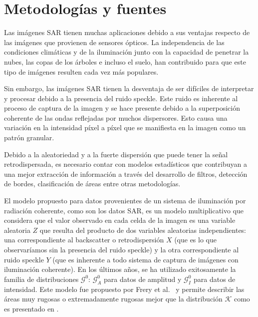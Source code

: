 \documentclass[12pt]{article}
\begin{document}
\section{Metodologías y fuentes}


Las imágenes SAR tienen muchas aplicaciones debido a sus ventajas respecto de las imágenes que provienen de sensores ópticos. La independencia de las condiciones climáticas y de la iluminación junto con la capacidad de penetrar la nubes, las copas de los árboles e incluso el suelo, han contribuido para que este tipo de imágenes resulten cada vez más populares.

Sin embargo, las imágenes SAR tienen la desventaja de ser difíciles de interpretar y procesar debido a la presencia del ruido speckle. Este ruido es inherente al proceso de captura de la imagen y se hace presente debido a la superposición coherente de las ondas reflejadas por muchos dispersores. Esto causa una variación en la intensidad píxel a píxel que se manifiesta en la imagen como un patrón granular. 

Debido a la aleatoriedad y a la fuerte dispersión que puede tener la señal retrodispersada, es necesario contar con modelos estadísticos que contribuyan a una mejor extracción de información a través del desarrollo de filtros, detección de bordes, clasificación de áreas entre otras metodologías. 


El modelo propuesto para datos provenientes de un sistema de iluminación por radiación coherente, como son los datos SAR, es un modelo multiplicativo que considera que el valor observado en cada celda de la imagen es una variable aleatoria $Z$ que resulta del producto de dos variables aleatorias independientes: una correspondiente al backscatter o retrodispersión $X$ (que es lo que observaríamos sin la presencia del ruido speckle) y la otra correspondiente al ruido speckle $Y$ (que es inherente a todo sistema de captura de imágenes con iluminación coherente). En los últimos años, se ha utilizado exitosamente la familia de distribuciones $\mathcal{G}^0$: $\mathcal{G}_A^0$ para datos de amplitud y $\mathcal G_I^0$ para datos de intensidad. Este modelo fue propuesto por Frery et al.~\cite{Frery97} y permite describir las áreas muy rugosas o extremadamente rugosas mejor que la distribución $\mathcal{K}$ como es presentado en \cite{Jakeman87}.
\end{document}
